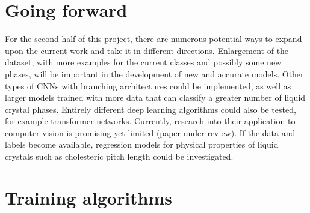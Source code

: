 \documentclass[12pt]{article}
\begin{document}
\section{Going forward}
For the second half of this project, there are numerous potential ways to expand upon the current work and take it in different directions. Enlargement of the dataset, with more examples for the current classes and possibly some new phases, will be important in the development of new and accurate models. Other types of CNNs with branching architectures could be implemented, as well as larger models trained with more data that can classify a greater number of liquid crystal phases. Entirely different deep learning algorithms could also be tested, for example transformer networks. Currently, research into their application to computer vision is promising yet limited \cite{Dosovitskiy20} (paper under review). If the data and labels become available, regression models for physical properties of liquid crystals such as cholesteric pitch length could be investigated.



\appendix
\appendixpage
\section{Training algorithms}
\end{document}
